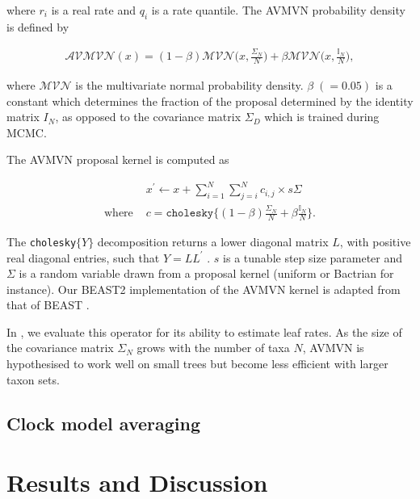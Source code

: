 \documentclass[10pt,letterpaper]{article}
\begin{document}
where $r_i$ is a real rate and $q_i$ is a rate quantile. The AVMVN probability density is defined by 


\begin{align}
	\mathcal{AVMVN}(x) = (1-\beta) \mathcal{MVN}\big(x, \frac{\Sigma_N}{N} \big) + \beta \mathcal{MVN}\big(x, \frac{\mathbb{I}_N}{N} \big),
\end{align}


where $\mathcal{MVN}$ is the multivariate normal probability density. $\beta \; (= 0.05)$ is a constant which determines the fraction of the proposal determined by the identity matrix ${I}_N$, as opposed to the covariance matrix $\Sigma_D$ which is trained during MCMC.

The AVMVN proposal kernel is computed as


\begin{align}
	& x^\prime \leftarrow x + \sum\limits_{i=1}^N \sum\limits_{j=i}^N c_{i,j} \times s\Sigma \\
	\text {where } & c = \texttt{cholesky} \{ (1-\beta) \frac{\Sigma_N}{N} + \beta \frac{\mathbb{I}_N}{N} \}.
\end{align}


The \texttt{cholesky}$\{Y\}$ decomposition returns a lower diagonal matrix $L$, with positive real diagonal entries, such that $Y = LL^\prime$ \cite{lindstrom1988newton, pourahmadi2007cholesky}. $s$ is a tunable step size parameter and $\Sigma$ is a random variable drawn from a proposal kernel (uniform or Bactrian for instance). Our BEAST2 implementation of the AVMVN kernel is adapted from that of BEAST \cite{suchard2018bayesian}.





In , we evaluate this operator for its ability to estimate leaf rates. As the size of the covariance matrix $\Sigma_N$ grows with the number of taxa $N$, AVMVN is hypothesised to work well on small trees but become less efficient with larger taxon sets.


\subsection*{Clock model averaging}




\section*{Results and Discussion} \label{sect:results}
\end{document}

